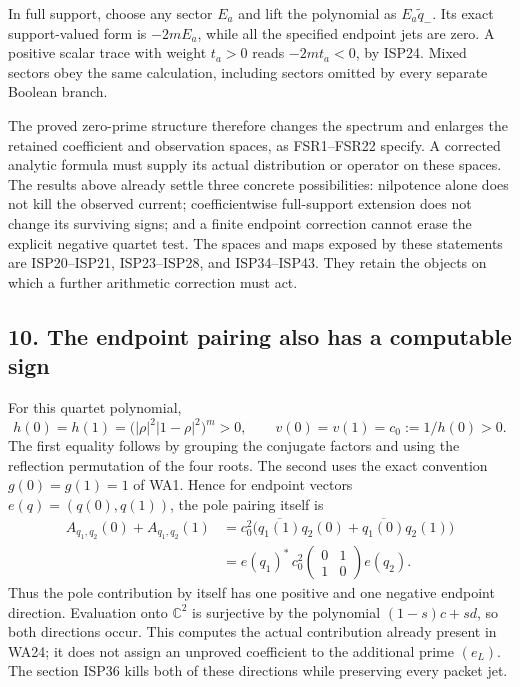 \documentclass[
  10pt,
  a4paper,
]{article}
\begin{document}
In full support, choose any sector \(E_a\) and lift the polynomial as
\(E_a\widetilde q_-\). Its exact support-valued form is \(-2mE_a\),
while all the specified endpoint jets are zero. A positive scalar trace
with weight \(t_a>0\) reads \(-2mt_a<0\), by ISP24. Mixed sectors obey
the same calculation, including sectors omitted by every separate
Boolean branch.

The proved zero-prime structure therefore changes the spectrum and
enlarges the retained coefficient and observation spaces, as FSR1--FSR22
specify. A corrected analytic formula must supply its actual
distribution or operator on these spaces. The results above already
settle three concrete possibilities: nilpotence alone does not kill the
observed current; coefficientwise full-support extension does not change
its surviving signs; and a finite endpoint correction cannot erase the
explicit negative quartet test. The spaces and maps exposed by these
statements are ISP20--ISP21, ISP23--ISP28, and ISP34--ISP43. They retain
the objects on which a further arithmetic correction must act.

\subsection{10. The endpoint pairing also has a computable
sign}\label{the-endpoint-pairing-also-has-a-computable-sign}

For this quartet polynomial, \[
h(0)=h(1)=\bigl(|\rho|^2|1-\rho|^2\bigr)^m>0,
\qquad v(0)=v(1)=c_0:=1/h(0)>0.
\] The first equality follows by grouping the conjugate factors and
using the reflection permutation of the four roots. The second uses the
exact convention \(g(0)=g(1)=1\) of WA1. Hence for endpoint vectors
\(e(q)=(q(0),q(1))\), the pole pairing itself is \[
\begin{aligned}
A_{q_1,q_2}(0)+A_{q_1,q_2}(1)
&=c_0^2\bigl(\overline{q_1(1)}q_2(0)+\overline{q_1(0)}q_2(1)\bigr)\\
&=e(q_1)^*\,c_0^2\begin{pmatrix}0&1\\1&0\end{pmatrix}e(q_2).
\end{aligned}
\tag{ISP44}
\] Thus the pole contribution by itself has one positive and one
negative endpoint direction. Evaluation onto \(\mathbb C^2\) is
surjective by the polynomial \((1-s)c+sd\), so both directions occur.
This computes the actual contribution already present in WA24; it does
not assign an unproved coefficient to the additional prime \((e_L)\).
The section ISP36 kills both of these directions while preserving every
packet jet.
\end{document}
